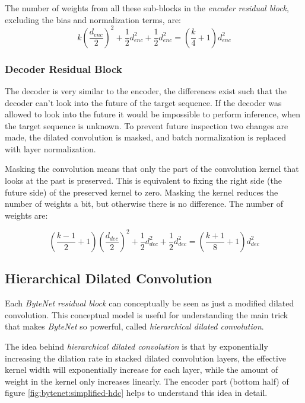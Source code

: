 The number of weights from all these sub-blocks in the \textit{encoder residual block}, excluding the bias and normalization terms, are:
\begin{equation}
k \left(\frac{d_{enc}}{2}\right)^2 + \frac{1}{2} d_{enc}^2 + \frac{1}{2} d_{enc}^2 = \left(\frac{k}{4} + 1\right) d_{enc}^2
\end{equation}


\subsubsection{Decoder Residual Block}

The decoder is very similar to the encoder, the differences exist such that the decoder can't look into the future of the target sequence. If the decoder was allowed to look into the future it would be impossible to perform inference, when the target sequence is unknown. To prevent future inspection two changes are made‚ the dilated convolution is masked, and batch normalization is replaced with layer normalization.

Masking the convolution means that only the part of the convolution kernel that looks at the past is preserved. This is equivalent to fixing the right side (the future side) of the preserved kernel to zero. Masking the kernel reduces the number of weights a bit, but otherwise there is no difference. The number of weights are:

\begin{equation}
\left(\frac{k-1}{2} + 1\right) \left(\frac{d_{dec}}{2}\right)^2 + \frac{1}{2} d_{dec}^2 + \frac{1}{2} d_{dec}^2 = \left(\frac{k + 1}{8} + 1\right) d_{dec}^2
\end{equation}


\subsection{Hierarchical Dilated Convolution}
\label{sec:theory:bytenet:hierarchical-dilated-convolution}

Each \textit{ByteNet residual block} can conceptually be seen as just a modified dilated convolution. This conceptual model is useful for understanding the main trick that makes \textit{ByteNet} so powerful, called \textit{hierarchical dilated convolution}.

The idea behind \textit{hierarchical dilated convolution} is that by exponentially increasing the dilation rate in stacked dilated convolution layers, the effective kernel width will exponentially increase for each layer, while the amount of weight in the kernel only increases linearly. The encoder part (bottom half) of figure \ref{fig:bytenet:simplified-hdc} helps to understand this idea in detail.

